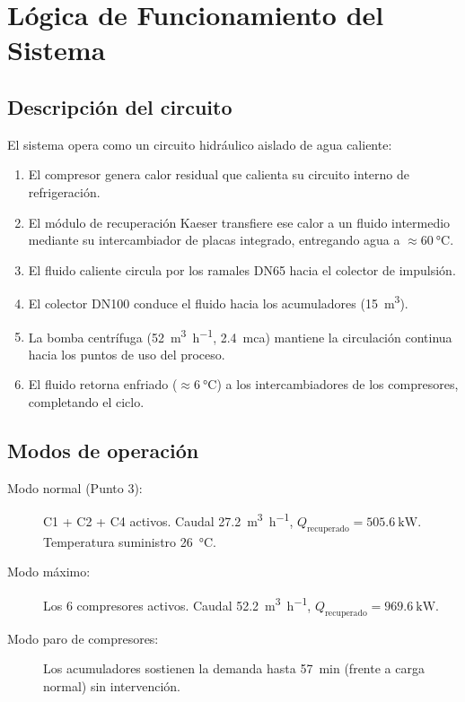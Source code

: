 \documentclass[11pt,a4paper]{article}
\begin{document}
\section{Lógica de Funcionamiento del Sistema}

\subsection{Descripción del circuito}

El sistema opera como un circuito hidráulico aislado de agua caliente:

\begin{enumerate}
  \item El compresor genera calor residual que calienta su circuito interno de refrigeración.
  \item El módulo de recuperación Kaeser transfiere ese calor a un fluido intermedio mediante
        su intercambiador de placas integrado, entregando agua a $\approx\SI{60}{\celsius}$.
  \item El fluido caliente circula por los ramales DN65 hacia el colector de impulsión.
  \item El colector DN100 conduce el fluido hacia los acumuladores (\SI{15}{\cubic\metre}).
  \item La bomba centrífuga (\SI{52}{\cubic\metre\per\hour}, \SI{2.4}{mca}) mantiene la
        circulación continua hacia los puntos de uso del proceso.
  \item El fluido retorna enfriado ($\approx\SI{6}{\celsius}$) a los intercambiadores de
        los compresores, completando el ciclo.
\end{enumerate}

\subsection{Modos de operación}

\begin{description}
  \item[Modo normal (Punto 3):] C1 + C2 + C4 activos. Caudal \SI{27.2}{\cubic\metre\per\hour},
    $Q_{\text{recuperado}} = \SI{505.6}{\kilo\watt}$. Temperatura suministro \SI{26}{\celsius}.

  \item[Modo máximo:] Los 6 compresores activos. Caudal \SI{52.2}{\cubic\metre\per\hour},
    $Q_{\text{recuperado}} = \SI{969.6}{\kilo\watt}$.

  \item[Modo paro de compresores:] Los acumuladores sostienen la demanda hasta
    \SI{57}{\minute} (frente a carga normal) sin intervención.
\end{description}
\end{document}
